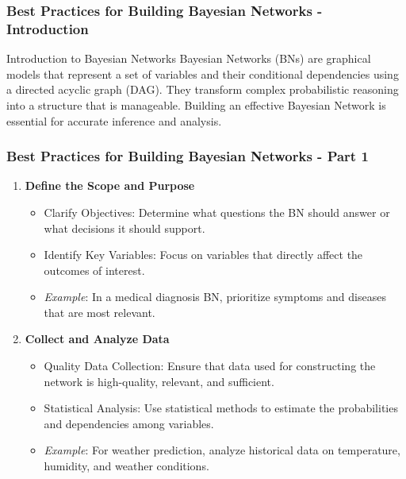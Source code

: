 \documentclass[aspectratio=169]{beamer}
\begin{document}
\begin{frame}[fragile]
    \frametitle{Best Practices for Building Bayesian Networks - Introduction}
    \begin{block}{Introduction to Bayesian Networks}
        Bayesian Networks (BNs) are graphical models that represent a set of variables and their conditional dependencies using a directed acyclic graph (DAG). They transform complex probabilistic reasoning into a structure that is manageable. Building an effective Bayesian Network is essential for accurate inference and analysis.
    \end{block}
\end{frame}

\begin{frame}[fragile]
    \frametitle{Best Practices for Building Bayesian Networks - Part 1}
    \begin{enumerate}
        \item \textbf{Define the Scope and Purpose}
        \begin{itemize}
            \item Clarify Objectives: Determine what questions the BN should answer or what decisions it should support.
            \item Identify Key Variables: Focus on variables that directly affect the outcomes of interest.
            \item \textit{Example}: In a medical diagnosis BN, prioritize symptoms and diseases that are most relevant.
        \end{itemize}
        
        \item \textbf{Collect and Analyze Data}
        \begin{itemize}
            \item Quality Data Collection: Ensure that data used for constructing the network is high-quality, relevant, and sufficient.
            \item Statistical Analysis: Use statistical methods to estimate the probabilities and dependencies among variables.
            \item \textit{Example}: For weather prediction, analyze historical data on temperature, humidity, and weather conditions.
        \end{itemize}
    \end{enumerate}
\end{frame}
\end{document}
